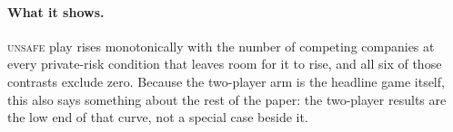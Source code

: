 \documentclass[sigconf,anonymous]{aamas}
\newcommand{\Unsafe}{\textsc{unsafe}}
\begin{document}

\paragraph{What it shows.} \Unsafe{} play rises monotonically with the number
of competing companies at every private-risk condition that leaves room for it
to rise, and all six of those contrasts exclude zero. Because the two-player
arm is the headline game itself, this also says something about the rest of the
paper: the two-player results are the low end of that curve, not a special case
beside it.
\end{document}
